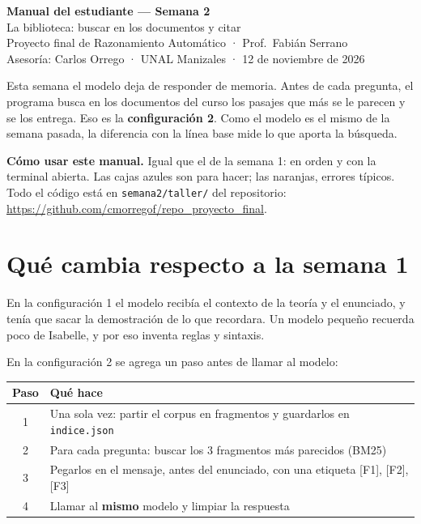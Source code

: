 \documentclass[11pt,a4paper]{article}
\newcommand{\cd}[1]{\texttt{\small #1}}
\begin{document}
\begin{center}
  {\LARGE\sffamily\bfseries\color{humano} Manual del estudiante --- Semana 2}\\[0.4em]
  {\large La biblioteca: buscar en los documentos y citar}\\[0.6em]
  {\sffamily\small\color{gray} Proyecto final de Razonamiento Automático · Prof.\ Fabián Serrano\\
  Asesoría: Carlos Orrego · UNAL Manizales · 12 de noviembre de 2026}
\end{center}

\begin{idea}
  Esta semana el modelo deja de responder de memoria. Antes de cada
  pregunta, el programa busca en los documentos del curso los pasajes que
  más se le parecen y se los entrega. Eso es la \textbf{configuración 2}.
  Como el modelo es el mismo de la semana pasada, la diferencia con la
  línea base mide lo que aporta la búsqueda.
\end{idea}

\textbf{Cómo usar este manual.} Igual que el de la semana 1: en orden y con
la terminal abierta. Las cajas azules son para hacer; las naranjas, errores
típicos. Todo el código está en \cd{semana2/taller/} del repositorio:
\url{https://github.com/cmorregof/repo_proyecto_final}.

\section{Qué cambia respecto a la semana 1}

En la configuración 1 el modelo recibía el contexto de la teoría y el
enunciado, y tenía que sacar la demostración de lo que recordara. Un modelo
pequeño recuerda poco de Isabelle, y por eso inventa reglas y sintaxis.

En la configuración 2 se agrega un paso antes de llamar al modelo:

\begin{center}
\small
\begin{tabular}{@{}cl@{}}
  \toprule
  Paso & Qué hace \\
  \midrule
  1 & Una sola vez: partir el corpus en fragmentos y guardarlos en \cd{indice.json} \\
  2 & Para cada pregunta: buscar los 3 fragmentos más parecidos (BM25) \\
  3 & Pegarlos en el mensaje, antes del enunciado, con una etiqueta [F1], [F2], [F3] \\
  4 & Llamar al \textbf{mismo} modelo y limpiar la respuesta \\
  \bottomrule
\end{tabular}
\end{center}
\end{document}
